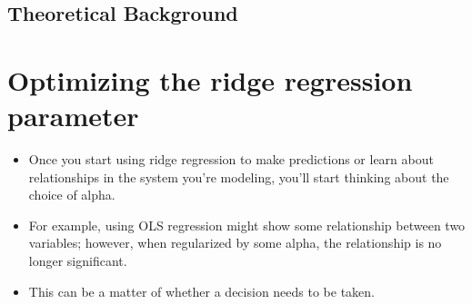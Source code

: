 \documentclass[SKL-MASTER.tex]{subfiles}
\begin{document}
\subsection{Theoretical Background}
%
%
%
\newpage
\section*{Optimizing the ridge regression parameter}
\begin{itemize}
\item Once you start using ridge regression to make predictions or learn about relationships in the
system you're modeling, you'll start thinking about the choice of alpha.
\item For example, using OLS regression might show some relationship between two variables;
however, when regularized by some alpha, the relationship is no longer significant. 
\item This can
be a matter of whether a decision needs to be taken.
\end{itemize}
\end{document}
